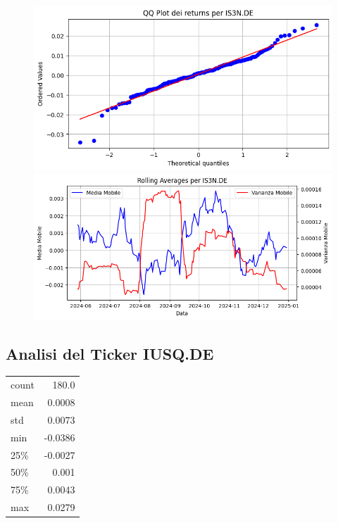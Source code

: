 \documentclass{article}%
\begin{document}
%


\begin{figure}[htbp]%
\begin{minipage}{0.48\textwidth}%
\includegraphics[width=\linewidth]{immagini_tickers/IS3N.DE_qq_plot.png}%
\end{minipage}%
\begin{minipage}{0.48\textwidth}%
\includegraphics[width=\linewidth]{immagini_tickers/IS3N.DE_rolling_averages.png}%
\end{minipage}%
\end{figure}

%
\subsection*{Analisi del Ticker IUSQ.DE}%
\label{subsec:AnalisidelTickerIUSQ.DE}%
\begin{tabular}{lr}%
count&180.0\\%
mean&0.0008\\%
std&0.0073\\%
min&{-}0.0386\\%
25\%&{-}0.0027\\%
50\%&0.001\\%
75\%&0.0043\\%
max&0.0279\\%
\end{tabular}%
\end{document}
